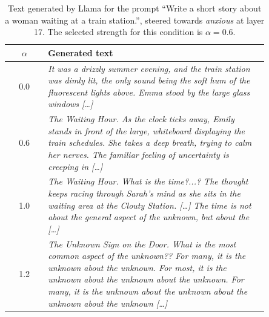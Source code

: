 \documentclass{article}
\begin{document}
\begin{table}[h!]
  \centering
  \small
  \begin{tabular}{cp{0.85\linewidth}}
    \toprule
    $\alpha$ & Generated text \\
    \midrule
    0.0 & \textit{It was a drizzly summer evening, and the train station was dimly lit, the only sound being the soft hum of the fluorescent lights above. Emma stood by the large glass windows [\dots]} \\
    0.6 & \textit{The Waiting Hour. As the clock ticks away, Emily stands in front of the large, whiteboard displaying the train schedules. She takes a deep breath, trying to calm her nerves. The familiar feeling of uncertainty is creeping in [\dots]} \\
    1.0 & \textit{The Waiting Hour. What is the time?...? The thought keeps racing through Sarah's mind as she sits in the waiting area at the Clouty Station. [\dots] The time is not about the general aspect of the unknown, but about the [\dots]} \\
    1.2 & \textit{The Unknown Sign on the Door. What is the most common aspect of the unknown?? For many, it is the unknown about the unknown. For most, it is the unknown about the unknown about the unknown. For many, it is the unknown about the unknown about the unknown about the unknown [\dots]} \\
    \bottomrule
  \end{tabular}
  \caption{Text generated by Llama for the prompt ``Write a short story about a woman waiting at a train station.'', steered towards \textit{anxious} at layer 17. The selected strength for this condition is $\alpha = 0.6$.}
  \label{tab:examples}
\end{table}
\end{document}
